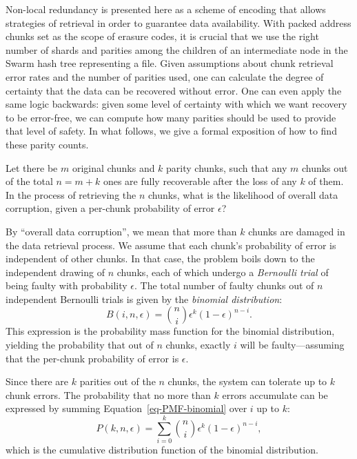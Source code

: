 \documentclass[a4paper,11pt]{article}
\begin{document}
Non-local redundancy is presented here as a scheme of encoding that allows strategies of retrieval in order to guarantee data availability.
With packed address chunks set as the scope of erasure codes, it is crucial that we use the right number of shards and parities among the children of an intermediate node in the Swarm hash tree representing a file.      
Given assumptions about chunk retrieval error rates and the number of parities used, one can calculate the degree of certainty that the data can be recovered without error. One can even apply the same logic backwards: given some level of certainty with which we want recovery to be error-free, we can compute how many parities should be used to provide that level of safety.
In what follows, we give a formal exposition of how to find these parity counts.


Let there be $m$ original chunks and $k$ parity chunks, such that any $m$ chunks out of the total $n = m + k$ ones are fully recoverable after the loss of any $k$ of them. In the process of retrieving the $n$ chunks, what is the likelihood of overall data corruption, given a per-chunk probability of error $\epsilon$?

By ``overall data corruption'', we mean that more than $k$ chunks are damaged in the data retrieval process. We assume that each chunk's probability of error is independent of other chunks. In that case, the problem boils down to the independent drawing of $n$ chunks, each of which undergo a \emph{Bernoulli trial} of being faulty with probability $\epsilon$. The total number of faulty chunks out of $n$ independent Bernoulli trials is given by the \emph{binomial distribution}:
\begin{equation}
  B(i, n, \epsilon) = \binom{n}{i} \epsilon^k (1-\epsilon)^{n-i} .
  \label{eq-PMF-binomial}
\end{equation}
This expression is the probability mass function for the binomial distribution, yielding the probability that out of $n$ chunks, exactly $i$ will be faulty---assuming that the per-chunk probability of error is $\epsilon$.

Since there are $k$ parities out of the $n$ chunks, the system can tolerate up to $k$ chunk errors. The probability that no more than $k$ errors accumulate can be expressed by summing Equation~\ref{eq-PMF-binomial} over $i$ up to $k$:
\begin{equation}
  P(k, n, \epsilon) = \sum_{i=0}^k \binom{n}{i} \epsilon^k (1-\epsilon)^{n-i} ,
  \label{eq-CDF-binomial}
\end{equation}
which is the cumulative distribution function of the binomial distribution.
\end{document}
